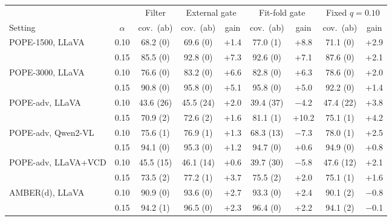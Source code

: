 \begin{tabular}{lcccccccc}
\toprule
 & & Filter & \multicolumn{2}{c}{External gate} & \multicolumn{2}{c}{Fit-fold gate} & \multicolumn{2}{c}{Fixed $q{=}0.10$}\\
\cmidrule(lr){4-5}\cmidrule(lr){6-7}\cmidrule(lr){8-9}
Setting & $\alpha$ & cov.\ (ab) & cov.\ (ab) & gain & cov.\ (ab) & gain & cov.\ (ab) & gain\\
\midrule
POPE-1500, LLaVA & 0.10 & 68.2 (0) & 69.6 (0) & +1.4 & 77.0 (1) & +8.8 & 71.1 (0) & +2.9\\
 & 0.15 & 85.5 (0) & 92.8 (0) & +7.3 & 92.6 (0) & +7.1 & 87.6 (0) & +2.1\\
\addlinespace
POPE-3000, LLaVA & 0.10 & 76.6 (0) & 83.2 (0) & +6.6 & 82.8 (0) & +6.3 & 78.6 (0) & +2.0\\
 & 0.15 & 90.8 (0) & 95.8 (0) & +5.1 & 95.8 (0) & +5.0 & 92.2 (0) & +1.4\\
\addlinespace
POPE-adv, LLaVA & 0.10 & 43.6 (26) & 45.5 (24) & +2.0 & 39.4 (37) & $-$4.2 & 47.4 (22) & +3.8\\
 & 0.15 & 70.9 (2) & 72.6 (2) & +1.6 & 81.1 (1) & +10.2 & 75.1 (1) & +4.2\\
\addlinespace
POPE-adv, Qwen2-VL & 0.10 & 75.6 (1) & 76.9 (1) & +1.3 & 68.3 (13) & $-$7.3 & 78.0 (1) & +2.5\\
 & 0.15 & 94.1 (0) & 95.3 (0) & +1.2 & 94.7 (0) & +0.6 & 94.9 (0) & +0.8\\
\addlinespace
POPE-adv, LLaVA+VCD & 0.10 & 45.5 (15) & 46.1 (14) & +0.6 & 39.7 (30) & $-$5.8 & 47.6 (12) & +2.1\\
 & 0.15 & 73.5 (2) & 77.2 (1) & +3.7 & 75.5 (2) & +2.0 & 75.1 (1) & +1.6\\
\addlinespace
AMBER(d), LLaVA & 0.10 & 90.9 (0) & 93.6 (0) & +2.7 & 93.3 (0) & +2.4 & 90.1 (2) & $-$0.8\\
 & 0.15 & 94.2 (1) & 96.5 (0) & +2.3 & 96.4 (0) & +2.2 & 94.1 (2) & $-$0.1\\
\bottomrule
\end{tabular}
